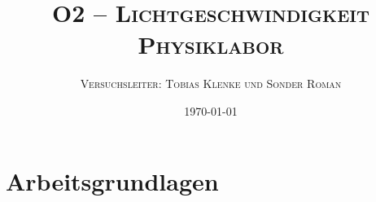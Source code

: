 \documentclass[10pt,a4paper,oneside]{article}
\title{
	\textsc{\huge{O2 -- Lichtgeschwindigkeit}}\\[4ex]
	\textsc{Physiklabor}
}
\author{\textsc{Versuchsleiter: Tobias Klenke und Sonder Roman}}
\date{\today}
\begin{document}
\maketitle

\noindent %

\clearpage
\color{black}

\setcounter{page}{1}
%

%

\tableofcontents
\clearpage


\setcounter{page}{1}
\section{Arbeitsgrundlagen}\label{sec:arbeitsgrundlagen}

\clearpage
\end{document}
